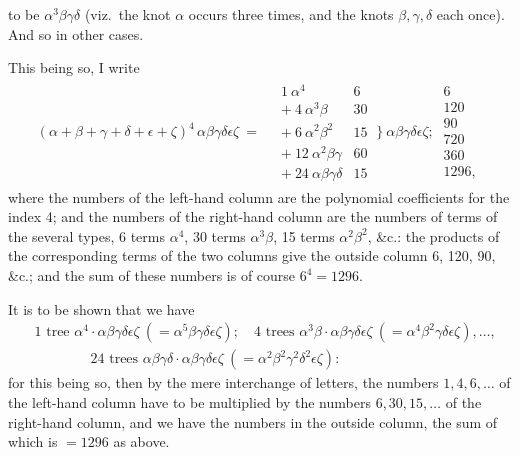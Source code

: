 \documentclass[11pt,a4paper]{article}
\begin{document}
\newpage

to be $\alpha^3\beta\gamma\delta$ (viz.\ the knot $\alpha$ occurs three times, and the knots $\beta, \gamma, \delta$ each once). And so in other cases.

\smallskip
This being so, I write
\[
\begin{aligned}
(\alpha + \beta + \gamma + \delta + \epsilon + \zeta)^4\,\alpha\beta\gamma\delta\epsilon\zeta\ =\ &
\begin{array}{rl}
1\ \alpha^4 & 6 \\
+\ 4\ \alpha^3\beta & 30 \\
+\ 6\ \alpha^2\beta^2 & 15 \\
+\ 12\ \alpha^2\beta\gamma & 60 \\
+\ 24\ \alpha\beta\gamma\delta & 15
\end{array}\
\Bigg\}\ \alpha\beta\gamma\delta\epsilon\zeta;\
\begin{array}{r}
6 \\ 120 \\ 90 \\ 720 \\ 360 \\ \hline 1296,
\end{array}
\end{aligned}
\]
where the numbers of the left-hand column are the polynomial coefficients for the index 4; and the numbers of the right-hand column are the numbers of terms of the several types, 6 terms $\alpha^4$, 30 terms $\alpha^3\beta$, 15 terms $\alpha^2\beta^2$, \&c.: the products of the corresponding terms of the two columns give the outside column 6, 120, 90, \&c.; and the sum of these numbers is of course $6^4 = 1296$.

\smallskip
It is to be shown that we have
\[
\begin{aligned}
&1\text{ tree }\alpha^4 \cdot \alpha\beta\gamma\delta\epsilon\zeta\ (= \alpha^5\beta\gamma\delta\epsilon\zeta); \quad
4\text{ trees }\alpha^3\beta \cdot \alpha\beta\gamma\delta\epsilon\zeta\ (= \alpha^4\beta^2\gamma\delta\epsilon\zeta), \ldots,\\
&\hspace{4em}24\text{ trees }\alpha\beta\gamma\delta \cdot \alpha\beta\gamma\delta\epsilon\zeta\ (= \alpha^2\beta^2\gamma^2\delta^2\epsilon\zeta):
\end{aligned}
\]
for this being so, then by the mere interchange of letters, the numbers $1, 4, 6, \ldots$ of the left-hand column have to be multiplied by the numbers $6, 30, 15, \ldots$ of the right-hand column, and we have the numbers in the outside column, the sum of which is $= 1296$ as above.
\end{document}
